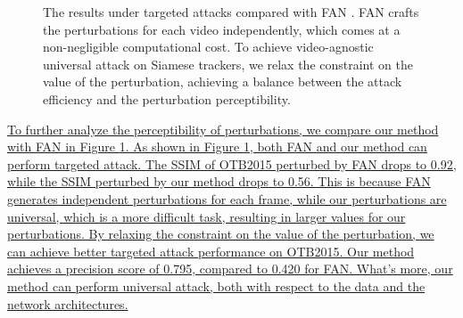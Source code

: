 \documentclass[journal]{IEEEtran}
\begin{document}
\begin{figure}[h]
  \centering
  \caption{The results under targeted attacks compared with FAN \cite{FAN}.  FAN crafts the perturbations for each video independently, which comes at a non-negligible computational cost. To achieve video-agnostic universal attack on Siamese trackers, we relax the constraint on the value of the perturbation, achieving a balance between the attack efficiency and the perturbation perceptibility.}
  \label{fig:vis}
\end{figure}

\uline{
To further analyze the perceptibility of perturbations, we compare our method with FAN in Figure \ref{fig:vis}.
As shown in Figure \ref{fig:vis}, both FAN \cite{FAN} and our method can perform targeted attack. 
The SSIM of OTB2015 perturbed by FAN drops to 0.92, while the SSIM perturbed by our method drops to 0.56.
This is because FAN generates independent perturbations for each frame, while our perturbations are universal, which is a more difficult task, resulting in larger values for our perturbations.
By relaxing the constraint on the value of the perturbation, we can achieve better targeted attack performance on OTB2015.
Our method achieves a precision score of 0.795, compared to 0.420 for FAN.
What's more, our method can perform universal attack, both with respect to the data and the network architectures.
}
\end{document}
